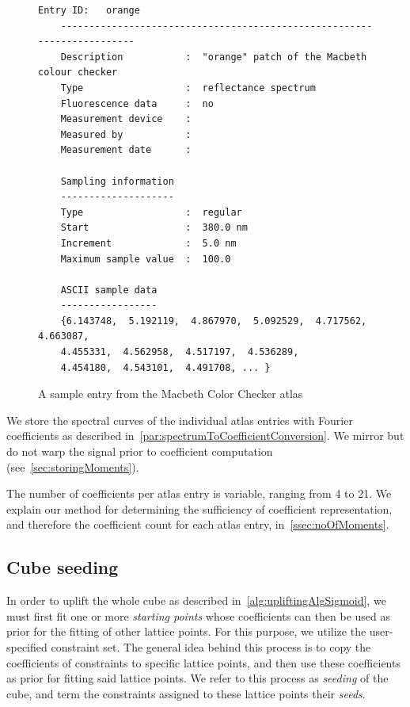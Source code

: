 \begin{figure}
	\begin{lstlisting}[label=lst:atlasEntry]
	Entry ID:   orange
	------------------------------------------------------------------------
	Description           :  "orange" patch of the Macbeth colour checker
	Type                  :  reflectance spectrum
	Fluorescence data     :  no
	Measurement device    :  
	Measured by           :  
	Measurement date      :  
	
	Sampling information
	--------------------
	Type	    	      :  regular
	Start                 :  380.0 nm
	Increment             :  5.0 nm
	Maximum sample value  :  100.0
	
	ASCII sample data
	-----------------
	{6.143748,  5.192119,  4.867970,  5.092529,  4.717562,  4.663087, 
	4.455331,  4.562958,  4.517197,  4.536289,
	4.454180,  4.543101,  4.491708, ... }
	\end{lstlisting}
	\caption{A sample entry from the Macbeth Color Checker atlas}
	\label{fig:macbethSampleText}
\end{figure}

We store the spectral curves of the individual atlas entries with Fourier coefficients as described in~\cref{par:spectrumToCoefficientConversion}. We mirror but do not warp the signal prior to coefficient computation (see~\cref{sec:storingMoments}).

The number of coefficients per atlas entry is variable, ranging from 4 to 21. We explain our method for determining the sufficiency of coefficient representation, and therefore the coefficient count for each atlas entry, in~\cref{ssec:noOfMoments}.

\subsection{Cube seeding} \label{ssec:cubeSeeding}

In order to uplift the whole cube as described in~\cref{alg:upliftingAlgSigmoid}, we must first fit one or more \emph{starting points} whose coefficients can then be used as prior for the fitting of other lattice points. For this purpose, we utilize the user-specified constraint set. The general idea behind this process is to copy the coefficients of constraints to specific lattice points, and then use these coefficients as prior for fitting said lattice points. We refer to this process as \emph{seeding} of the cube, and term the constraints assigned to these lattice points their \emph{seeds}.


